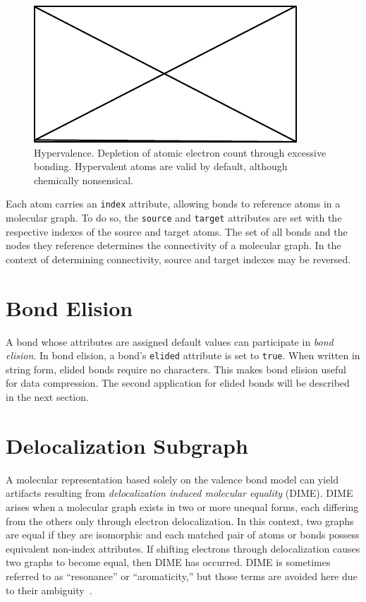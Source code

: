 \documentclass{article}
\def\ttt{\texttt}
\begin{document}
\begin{figure}
    \centering
    \includegraphics{filler}
    \caption{Hypervalence. Depletion of atomic electron count through excessive bonding. Hypervalent atoms are valid by default, although chemically nonsensical.}
    \label{fig:hypervalence}
\end{figure}

Each atom carries an \ttt{index} attribute, allowing bonds to reference atoms in a molecular graph. To do so, the \ttt{source} and \ttt{target} attributes are set with the respective indexes of the source and target atoms. The set of all bonds and the nodes they reference determines the connectivity of a molecular graph. In the context of determining connectivity, source and target indexes may be reversed.

\section*{Bond Elision}

A bond whose attributes are assigned default values can participate in \textit{bond elision}. In bond elision, a bond's \ttt{elided} attribute is set to \ttt{true}. When written in string form, elided bonds require no characters. This makes bond elision useful for data compression. The second application for elided bonds will be described in the next section.

\section*{Delocalization Subgraph}

A molecular representation based solely on the valence bond model can yield artifacts resulting from \textit{delocalization induced molecular equality} (DIME). DIME arises when a molecular graph exists in two or more unequal forms, each differing from the others only through electron delocalization. In this context, two graphs are equal if they are isomorphic and each matched pair of atoms or bonds possess equivalent non-index attributes. If shifting electrons through delocalization causes two graphs to become equal, then DIME has occurred. DIME is sometimes referred to as \enquote{resonance} or \enquote{aromaticity,} but those terms are avoided here due to their ambiguity~\cite{randic:2018,kerber:2006}.
\end{document}
